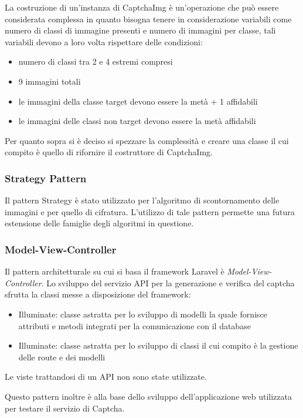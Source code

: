 La costruzione di un'instanza di CaptchaImg è un'operazione che può essere considerata complessa in quanto
bisogna tenere in considerazione variabili come numero di classi di immagine presenti e numero di immagini per classe,
tali variabili devono a loro volta rispettare delle condizioni:
\begin{itemize}
    \item numero di classi tra 2 e 4 estremi compresi
    \item 9 immagini totali
    \item le immagini della classe target devono essere la metà + 1 affidabili
    \item le immagini delle classi non target devono essere la metà affidabili
\end{itemize}
Per quanto sopra si è deciso si spezzare la complessità e creare una classe il cui compito è quello di rifornire il costruttore
di CaptchaImg. 

\subsubsection{Strategy Pattern}

Il pattern Strategy è stato utilizzato per l'algoritmo di scontornamento delle immagini e per quello di cifratura.
L'utilizzo di tale pattern permette una futura estensione delle famiglie degli algoritmi in questione.


\subsubsection{Model-View-Controller}
Il pattern architetturale su cui si basa il framework Laravel è \textit{Model-View-Controller}.
Lo sviluppo del servizio API per la generazione e verifica del captcha sfrutta la classi messe a disposizione del framework:
\begin{itemize}
    \item Illuminate\Database\Eloquent\Model: classe astratta per lo sviluppo di modelli la quale fornisce attributi e metodi integrati per la comunicazione con il database
    \item Illuminate\Routing\Controller: classe astratta per lo sviluppo di classi il cui compito è la gestione delle route e dei modelli
\end{itemize}
Le viste trattandosi di un API non sono state utilizzate.

Questo pattern inoltre è alla base dello sviluppo dell'applicazione web utilizzata per testare il servizio di Captcha.